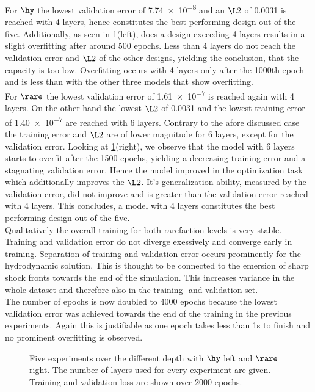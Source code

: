 For \(\hy\) the lowest validation error of \num{7.74e-8} and an \(\L2\) of 0.0031 is reached with 4 layers, hence constitutes the best performing design out of the five. Additionally, as seen in \cref{Fig:Depth}(left), does a design exceeding 4 layers results in a slight overfitting after around 500 epochs. Less than 4 layers do not reach the validation error and \(\L2\) of the other designs, yielding the conclusion, that the capacity is too low. Overfitting occurs with 4 layers only after the 1000th epoch and is less than with the other three models that show overfitting.\\
For \(\rare\) the lowest validation error of \num{1.61e-7} is reached again with 4 layers. On the other hand the lowest \(\L2\) of 0.0031 and the lowest training error of \num{1.40e-7} are reached with 6 layers. Contrary to the afore discussed case the training error and \(\L2\) are of lower magnitude for 6 layers, except for the validation error. Looking at \cref{Fig:Depth}(right), we observe that the model with 6 layers starts to overfit after the 1500 epochs, yielding a decreasing training error and a stagnating validation error. Hence the model improved in the optimization task which additionally improves the \(\L2\). It's generalization ability, measured by the validation error, did not improve and is greater than the validation error reached with 4 layers. This concludes, a model with 4 layers constitutes the best performing design out of the five.\\
Qualitatively the overall training for both rarefaction levels is very stable. Training and validation error do not diverge exessively and converge early in training. Separation of training and validation error occurs prominently for the hydrodynamic solution. This is thought to be connected to the emersion of sharp shock fronts towards the end of the simulation. This increases variance in the whole dataset and therefore also in the training- and validation set.\\
The number of epochs is now doubled to 4000 epochs because the lowest validation error was achieved towards the end of the training in the previous experiments. Again this is justifiable as one epoch takes less than 1s to finish and no prominent overfitting is observed. 
\begin{center}
	\begin{figure}[htbp!]
		
		
		\caption{Five experiments over the different depth with $\hy$ left and $\rare$ right. The number of layers used for every experiment are given. Training and validation loss are shown over 2000 epochs.}
		\label{Fig:Depth}
	\end{figure}
\end{center}

